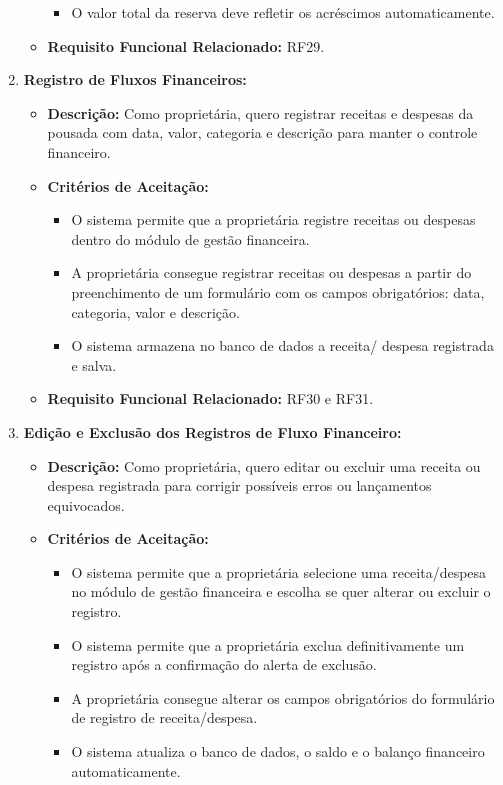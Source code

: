 \documentclass[
	12pt,				%
	openany,			%
	twoside,			%
	a4paper,			%
	english,			%
	french,				%
	spanish,			%
	brazil				%
	]{abntex2}
\begin{document}
\begin{enumerate}[label=\textbf{\arabic*.}]
\begin{itemize}
\begin{itemize}
	 		\item O valor total da reserva deve refletir os acréscimos automaticamente.
	 	\end{itemize}
	 	\item \textbf{Requisito Funcional Relacionado:} RF29.
	 \end{itemize} 
	  \item \textbf{Registro de Fluxos Financeiros:}
	 \begin{itemize}
	 	\item \textbf{Descrição:} Como proprietária, quero registrar receitas e despesas da pousada com data, valor, categoria e descrição para manter o controle financeiro. 
	 	\item \textbf{Critérios de Aceitação:}
	 	\begin{itemize}
	 		\item O sistema permite que a proprietária registre receitas ou despesas dentro do módulo de gestão financeira.
	 		\item A proprietária consegue registrar receitas ou despesas a partir do preenchimento de um formulário com os campos obrigatórios: data, categoria, valor e descrição.
	 		\item O sistema armazena no banco de dados a receita/ despesa registrada e salva.
	 	\end{itemize}
	 	\item \textbf{Requisito Funcional Relacionado:} RF30 e RF31.
	 \end{itemize} 
	  \item \textbf{Edição e Exclusão dos Registros de Fluxo Financeiro:}
	 \begin{itemize}
	 	\item \textbf{Descrição:} Como proprietária, quero editar ou excluir uma receita ou despesa registrada para corrigir possíveis erros ou lançamentos equivocados.
	 	\item \textbf{Critérios de Aceitação:}
	 	\begin{itemize}
	 		\item O sistema permite que a proprietária selecione uma receita/despesa no módulo de gestão financeira e escolha se quer alterar ou excluir o registro.
	 		\item O sistema permite que a proprietária exclua definitivamente um registro após a confirmação do alerta de exclusão.
	 		\item A proprietária consegue alterar os campos obrigatórios do formulário de registro de receita/despesa.
	 		\item O sistema atualiza o banco de dados, o saldo e o balanço financeiro automaticamente. 

\end{itemize}
\end{itemize}
\end{enumerate}
\end{document}
